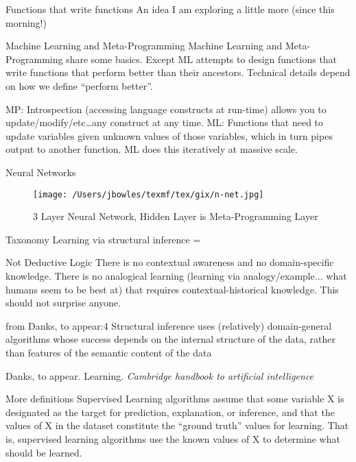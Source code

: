 \documentclass{beamer}
\begin{document}
\begin{frame}{Functions that write functions}
  An idea I am exploring a little more (since this morning!)
  \begin{exampleblock}{Machine Learning and Meta-Programming}
    Machine Learning and Meta-Programming share some basics.
    Except ML attempts to design functions that write functions that perform
    better than their ancestors. Technical details depend on how we define
    ``perform better''. 
  \end{exampleblock}
 MP: Introspection (accessing language constructs at run-time) allows you to update/modify/etc\dots any construct
 at any time.
 ML: Functions that need to update variables given unknown values of those variables, which in turn pipes output
 to another function. ML does this iteratively at massive scale.
\end{frame}

\begin{frame}{Neural Networks}
	\begin{figure}[htpb]
		\begin{center}
			\texttt{[image: /Users/jbowles/texmf/tex/gix/n-net.jpg]}\caption{\scriptsize 3 Layer Neural Network, Hidden Layer is Meta-Programming Layer}
		\end{center}
	\end{figure}
\end{frame}

\begin{frame}{Taxonomy}
	Learning via structural inference = 
	\begin{exampleblock}{\sc Not Deductive Logic}
		There is no contextual awareness and no domain-specific knowledge. There is no analogical learning (learning via analogy/example... what humans seem to be best at) that requires contextual-historical knowledge. This should not surprise anyone.
	\end{exampleblock}
	\begin{exampleblock}{from Danks, to appear:4}
		Structural inference uses (relatively) domain-general algorithms whose success depends on the internal structure of the data, rather than features of the semantic content of the data
	\end{exampleblock}
	Danks, to appear. Learning. {\it Cambridge handbook to artificial intelligence}
\end{frame}

\begin{frame}{More definitions}
	Supervised Learning algorithms assume that some variable X is designated as the target for prediction, explanation, or inference, and that the values of X in the dataset constitute the ``ground truth'' values for learning. That is, supervised learning algorithms use the known values of X to determine what should be learned.
\end{frame} 
\end{document}
